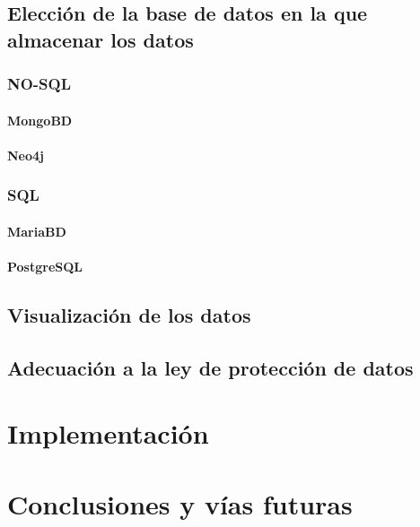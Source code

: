 \documentclass[a4paper,openright,11pt]{book}
\begin{document}
\section{Elección de la base de datos en la que almacenar los datos}
\setcounter{section}{0}
\subsection{NO-SQL}
\subsubsection{MongoBD}
\subsubsection{Neo4j}
\subsection{SQL}
\subsubsection{MariaBD}
\subsubsection{PostgreSQL}
\section{Visualización de los datos}
\section{Adecuación a la ley de protección de datos}
\chapter{Implementación}
\chapter{Conclusiones y vías futuras}

%
%
%
%
%
%
%
%
%
%
%
%
%
%
%
%
%
%
%
%
%
%
\chapter*{}
\thispagestyle{empty}
\end{document}
